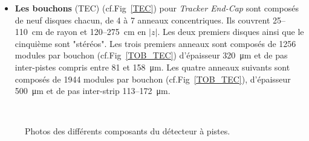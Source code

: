 \begin{itemize}[label=$\bullet$]
\item \textbf{Les bouchons }(TEC) (cf.Fig~\ref{TEC}) pour \textit{Tracker End-Cap} sont composés de neuf disques chacun, de \num{4} à \num{7} anneaux concentriques. Ils couvrent \num{25}--\SI{110}{\centi\meter} de rayon et \num{120}--\SI{275}{\centi\meter} en $|z|$. Les deux premiers disques ainsi que le cinquième sont "stéréos". Les trois premiers anneaux sont composés de \num{1256} modules par bouchon (cf.Fig~\ref{TOB_TEC}) d'épaisseur \SI{320}{\micro\meter} et de pas inter-pistes compris entre \num{81} et \SI{158}{\micro\meter}. Les quatre anneaux suivants sont composés de \num{1944} modules par bouchon (cf.Fig~\ref{TOB_TEC}), d'épaisseur \SI{500}{\micro\meter} et de pas inter-strip \num{113}--\SI{172}{\micro\meter}.
\end{itemize}

	\begin{figure}[ht!]
	\centering
	\\
	\caption{Photos des différents composants du détecteur à pistes.}
\end{figure}

